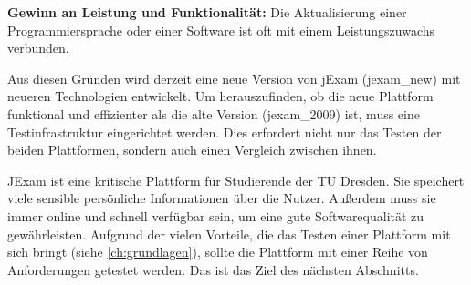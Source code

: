 \textbf{Gewinn an Leistung und Funktionalität:} Die Aktualisierung einer
Programmiersprache oder einer Software ist oft mit einem
Leistungszuwachs verbunden.

Aus diesen Gründen wird derzeit eine neue Version von jExam (\gls{jexam_new})
mit neueren Technologien entwickelt. Um herauszufinden, ob die neue
Plattform funktional und effizienter als die alte Version (\gls{jexam_2009})
ist, muss eine Testinfrastruktur eingerichtet werden. Dies erfordert
nicht nur das Testen der beiden Plattformen, sondern auch einen Vergleich
zwischen ihnen.


JExam ist eine kritische Plattform für Studierende der TU Dresden.
Sie speichert viele sensible persönliche Informationen über die
Nutzer. Außerdem muss sie immer online und schnell verfügbar sein,
um eine gute Softwarequalität zu gewährleisten. Aufgrund der vielen
Vorteile, die das Testen einer Plattform mit sich bringt
(siehe \autoref{ch:grundlagen}), sollte die Plattform mit einer Reihe von
Anforderungen getestet werden. Das ist das Ziel des nächsten Abschnitts.